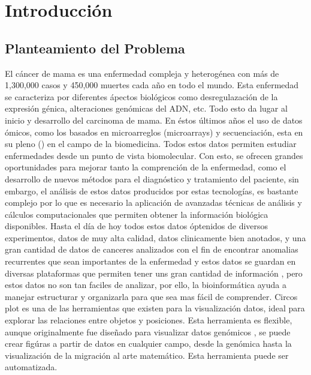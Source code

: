 \documentclass[12pt,letterpaper]{article}
\author{Juan Jose Martinez Ulloa}
\begin{document}
\tableofcontents %
\section{Introducci\'{o}n}
\subsection{Planteamiento del Problema}
El cáncer de mama es una enfermedad compleja y heterogénea con más de 1,300,000 casos y 450,000 muertes cada año en todo el mundo. Esta enfermedad se caracteriza por diferentes ápectos biológicos como desregulazación de la expresión génica, alteraciones genómicas del ADN, etc. Todo esto da lugar al inicio y desarrollo del carcinoma de mama. En éstos últimos años el uso de datos ómicos, como los basados en  microarreglos (microarrays) y secuenciación, esta en su pleno () en el campo de la biomedicina. Todos estos datos permiten estudiar enfermedades desde un punto de vista biomolecular. Con esto, se ofrecen grandes oportunidades para mejorar tanto la comprención de la enfermedad, como el desarrollo de nuevos métodos para el diagnóstico y tratamiento del paciente, sin embargo, el análisis de estos datos producidos por estas tecnologías, es bastante complejo por lo que es necesario la aplicación de avanzadas técnicas de análisis y cálculos computacionales que permiten obtener la información biológica disponibles. Hasta el día de hoy todos estos datos óptenidos de diversos experimentos, datos de muy alta calidad, datos clinicamente bien anotados, y una gran cantidad de datos de canceres analizados con el fin de encontrar anomalias recurrentes que sean importantes de la enfermedad y estos datos se guardan en diversas plataformas que permiten tener uns gran cantidad de información , pero estos datos no son tan faciles de analizar, por ello, la bioinformática ayuda a manejar estructurar y organizarla para que sea mas fácil de comprender. Circos plot es una de las herramientas que existen para la visualización datos, ideal para explorar las relaciones entre objetos y posiciones. Esta herramienta es flexible, aunque originalmente fue diseñado para visualizar datos genómicos , se puede crear figúras a partir de datos en cualquier campo, desde la genómica hasta la visualización de la migración al arte matemático. Esta herramienta puede ser automatizada. %
\end{document}
